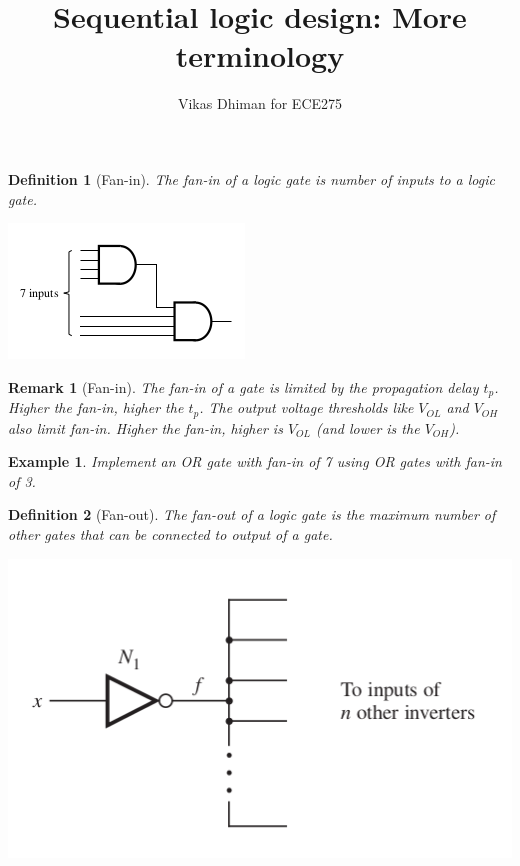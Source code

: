 \documentclass{article}
\author{Vikas Dhiman for ECE275}
\title{Sequential logic design: More terminology}
\newtheorem{example}{Example}
\newtheorem{remark}{Remark}
\newtheorem{definition}{Definition}
\begin{document}
\maketitle


\begin{definition}[Fan-in]
  The fan-in of a logic gate is number of  inputs to a logic gate.~\cite[Section~B.8.9]{stephen2022fundamentals}
\end{definition}
\includegraphics[width=0.3\linewidth]{./media/fan-in.png}

\begin{remark}[Fan-in]
  The fan-in of a gate is limited by the propagation delay $t_p$. Higher the
  fan-in, higher the $t_p$. The output
  voltage thresholds like $V_{OL}$ and $V_{OH}$ also limit fan-in. Higher the
  fan-in, higher is $V_{OL}$ (and lower is the $V_{OH}$).
\end{remark}

\begin{example}
  Implement an OR gate with fan-in of 7 using OR gates with fan-in of 3.
\end{example}
\vspace{5em}

\begin{definition}[Fan-out]
  The fan-out of a logic gate is the maximum number of other gates that can be connected
  to output of a gate.~\cite[Section~B.8.9]{stephen2022fundamentals}
\end{definition}
\includegraphics[width=0.5\linewidth]{./media/fan-out.png}
\end{document}
